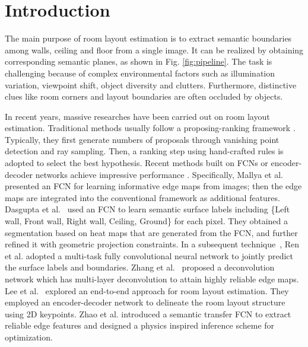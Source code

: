 \section{Introduction}
\label{sec:intro}

The main purpose of room layout estimation is to extract semantic boundaries among walls, ceiling and floor from a single image. It can be realized by obtaining corresponding semantic planes, as shown in Fig. \ref{fig:pipeline}. The task is challenging because of complex environmental factors such as illumination variation, viewpoint shift, object diversity and clutters. Furthermore, distinctive clues like room corners and layout boundaries are often occluded by objects. 

In recent years, massive researches have been carried out on room layout estimation. Traditional methods usually follow a proposing-ranking framework \cite{hedau2009recovering,wang2013discriminative,gupta2010estimating,hedau2010thinking}. Typically, they first generate numbers of proposals through vanishing point detection and ray sampling. Then, a ranking step using hand-crafted rules is adopted to select the best hypothesis. Recent methods built on FCNs \cite{long2015fully} or encoder-decoder networks achieve impressive performance \cite{mallya2015learning,ren2016coarse,zhang2017learning,dasgupta2016delay,LeeRoomNet17,zhao2017physics}. 
Specifically, Mallya et al.~\cite{mallya2015learning} presented an FCN for learning informative edge maps from images;  then the edge maps are integrated into the conventional framework as additional features. 
%
Dasgupta et al.~\cite{dasgupta2016delay} used an FCN to learn semantic surface labels including \{Left wall, Front wall, Right wall, Ceiling, Ground\} for each pixel. They obtained a segmentation based on heat maps that are generated from the FCN, and further refined it with geometric projection constraints.
% 
In a subsequent technique~\cite{ren2016coarse}, Ren et al. adopted a multi-task fully convolutional neural network to jointly predict the surface labels and boundaries. 
%
Zhang et al.~\cite{zhang2017learning} proposed a deconvolution network which has multi-layer deconvolution to attain highly reliable edge maps. 
%
Lee et al.~\cite{LeeRoomNet17} explored an end-to-end approach for room layout estimation. They employed an encoder-decoder network to delineate the room layout structure using 2D keypoints.
%
Zhao et al. \cite{zhao2017physics} introduced a semantic transfer FCN to extract reliable edge features and designed a physics inspired inference scheme for optimization.


